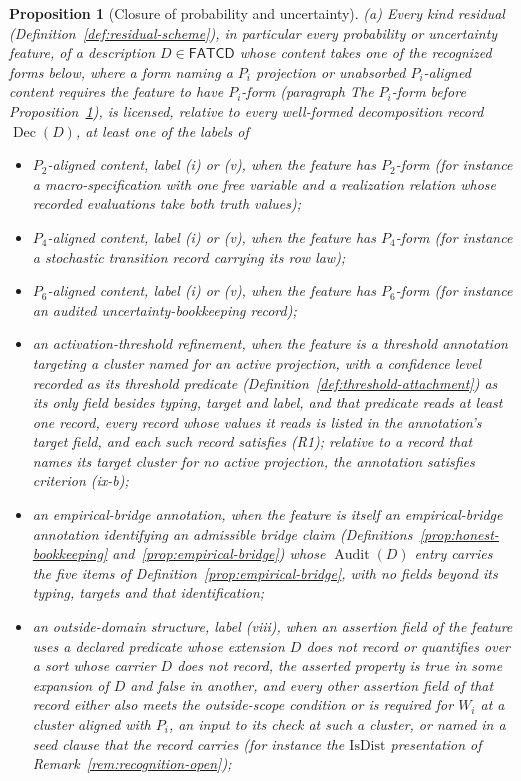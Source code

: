 \documentclass[11pt]{article}
\newtheorem{proposition}[theorem]{Proposition}
\theoremstyle{definition}
\newcommand{\FATCD}{\ensuremath{\mathsf{FATCD}}}
\newcommand{\Audit}[1]{\ensuremath{\operatorname{Audit}\!\left(#1\right)}}
\newcommand{\Dec}[1]{\ensuremath{\operatorname{Dec}\!\left(#1\right)}}
\begin{document}
\begin{proposition}[Closure of probability and uncertainty]\label{prop:probability-closure}
\textup{(a)} Every kind residual (Definition~\ref{def:residual-scheme}), in particular every probability or uncertainty feature, of a description
\(D \in \FATCD{}\) whose content takes one of the recognized forms below,
where a form naming a \(P_i\) projection or unabsorbed \(P_i\)-aligned content
requires the feature to have \(P_i\)-form (paragraph \emph{The \(P_i\)-form}
before Proposition~\ref{prop:probability-closure}),
is licensed, relative to every well-formed decomposition record \(\Dec{D}\), at least one of the labels of
\begin{itemize}[topsep=2pt,itemsep=1pt]
  \item \(P_2\)-aligned content, label (i) or (v), when the feature has \(P_2\)-form (for
    instance a macro-specification with one free variable and a realization
    relation whose recorded evaluations take both truth values);
  \item \(P_4\)-aligned content, label (i) or (v), when the feature has \(P_4\)-form (for
    instance a stochastic transition record carrying its row law);
  \item \(P_6\)-aligned content, label (i) or (v), when the feature has \(P_6\)-form (for
    instance an audited uncertainty-bookkeeping record);
  \item an activation-threshold refinement, when the feature is a threshold
    annotation targeting a cluster named for an active projection, with a
    confidence level recorded as its threshold predicate
    (Definition~\ref{def:threshold-attachment}) as its only field besides
    typing, target and label, and that predicate reads at least one record, every record whose values it reads is listed in the annotation's target field, and each such record satisfies (R1); relative to a record that names its target cluster for
    no active projection, the annotation satisfies criterion (ix-b);
  \item an empirical-bridge annotation, when the feature is itself an empirical-bridge annotation identifying an admissible bridge claim (Definitions~\ref{prop:honest-bookkeeping} and~\ref{prop:empirical-bridge}) whose \(\Audit{D}\) entry carries the five items of Definition~\ref{prop:empirical-bridge}, with no fields beyond its typing, targets and that identification;
  \item an outside-domain structure, label (viii), when an assertion field of the feature uses a declared predicate whose extension \(D\) does not record or quantifies over a sort whose carrier \(D\) does not record, the asserted property is true in some expansion of \(D\) and false in another, and every other assertion field of that record either also meets the outside-scope condition or is required for \(W_i\) at a cluster aligned with \(P_i\), an input to its check at such a cluster, or named in a seed clause that the record carries (for instance the \(\mathrm{IsDist}\) presentation of Remark~\ref{rem:recognition-open});

\end{itemize}
\end{proposition}
\end{document}
